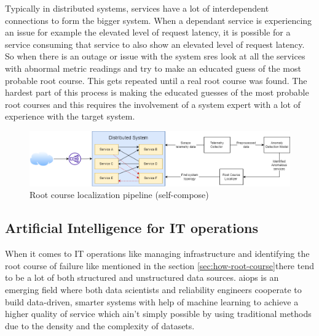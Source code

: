 Typically in distributed systems, services have a lot of interdependent connections to form the bigger system. When a dependant service is experiencing an issue for example the elevated level of request latency, it is possible for a service consuming that service to also show an elevated level of request latency. So when there is an outage or issue with the system \acp{sre} look at all the services with abnormal metric readings and try to make an educated guess of the most probable root course. This gets repeated until a real root course was found. The hardest part of this process is making the educated guesses of the most probable root courses and this requires the involvement of a system expert with a lot of experience with the target system.

\begin{figure}[H]
    \includegraphics[width=16cm]{assets/literature-review/demo.png}
    \caption{Root course localization pipeline (self-compose)}
\end{figure}

\subsection{Artificial Intelligence for IT operations}

When it comes to IT operations like managing infrastructure and identifying the root course of failure like mentioned in the section \ref{sec:how-root-course}there tend to be a lot of both structured and unstructured data sources. \ac{aiops} is an emerging field \citep{Artifici8:online} where both data scientists and reliability engineers cooperate to build data-driven, smarter systems with help of machine learning to achieve a higher quality of service which ain't simply possible by using traditional methods due to the density and the complexity of datasets.

